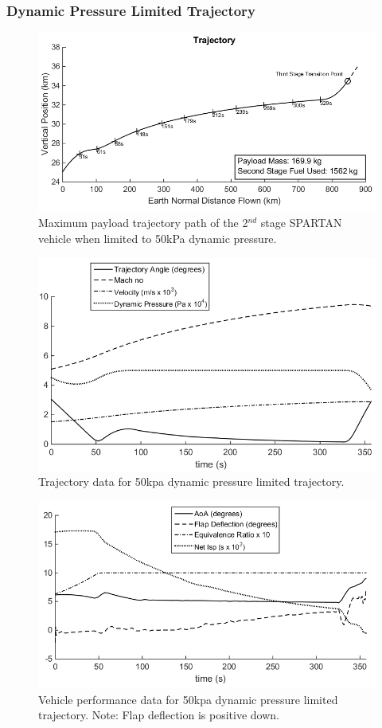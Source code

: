 \documentclass[journal]{new-aiaa}
\begin{document}
\subsubsection{Dynamic Pressure Limited Trajectory} \label{subsection:50kPalimit}



\begin{figure}[ht]
	\centering
	\includegraphics[width=.7\linewidth]{qlimited50kPa}
	\caption{Maximum payload trajectory path of the 2$^{nd}$ stage SPARTAN vehicle when limited to 50kPa dynamic pressure.}
	\label{fig:qlimited}
\end{figure}
\begin{figure}[ht]
	\centering
	\includegraphics[width=.6\linewidth]{qlimited50kPa-aero}
	\caption{Trajectory data for 50kpa dynamic pressure limited trajectory.}
	\label{fig:qlimited aero}
\end{figure}
\begin{figure}[ht]
	\centering
	\includegraphics[width=.6\linewidth]{qlimited-Vehicle}
	\caption{Vehicle performance data for 50kpa dynamic pressure limited trajectory. Note: Flap deflection is positive down.}
	\label{fig:qlimited vehicle}
\end{figure}
\end{document}
